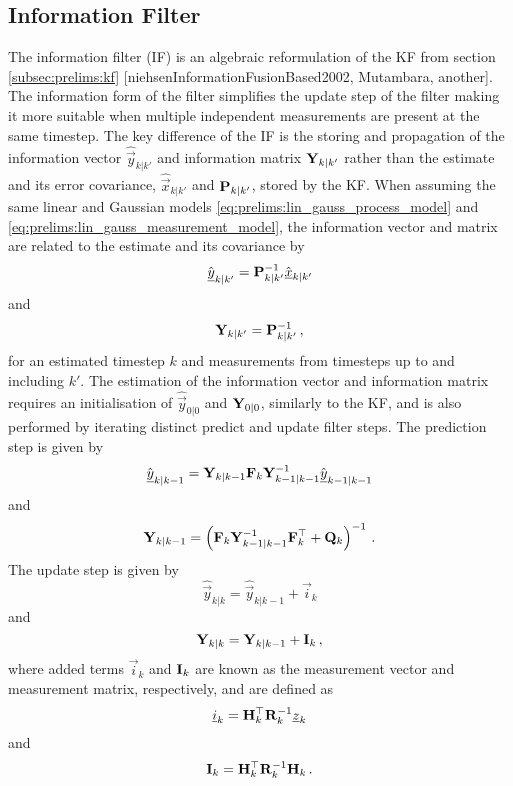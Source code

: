 \subsection{Information Filter}\label{subsec:prelims:if}
The information filter (IF) is an algebraic reformulation of the KF from section \ref{subsec:prelims:kf} [niehsenInformationFusionBased2002, Mutambara, another]. The information form of the filter simplifies the update step of the filter making it more suitable when multiple independent measurements are present at the same timestep. The key difference of the IF is the storing and propagation of the information vector $\hat{\vec{y}}_{k|k'}$ and information matrix ${{\mathbf{Y}}}_{k|k'}$ rather than the estimate and its error covariance, $\hat{\vec{x}}_{k|k'}$ and ${{\mathbf{P}}}_{k|k'}$, stored by the KF. When assuming the same linear and Gaussian models \eqref{eq:prelims:lin_gauss_process_model} and \eqref{eq:prelims:lin_gauss_measurement_model}, the information vector and matrix are related to the estimate and its covariance by
\begin{equation}\label{eq:prelims:info_vec_defn}
    \hat{{\underline{y}}}_{k|k'} = {{\mathbf{P}}}_{k|k'}^{-1}\hat{{\underline{x}}}_{k|k'}
\end{equation}
and
\begin{equation}\label{eq:prelims:info_mat_defn}
    {\ensuremath{{\mathbf{Y}}}}_{k|k'} = {{\mathbf{P}}}_{k|k'}^{-1}\,,
\end{equation}
for an estimated timestep $k$ and measurements from timesteps up to and including $k'$. The estimation of the information vector and information matrix requires an initialisation of $\hat{\vec{y}}_{0|0}$ and ${{\mathbf{Y}}}_{0|0}$, similarly to the KF, and is also performed by iterating distinct predict and update filter steps. The prediction step is given by
\begin{equation}\label{eq:prelims:if_info_vec_predict}
    \hat{{\underline{y}}}_{k|k-1} = {{\mathbf{Y}}}_{k|k-1}{{\mathbf{F}}}_k{{\mathbf{Y}}}_{k-1|k-1}^{-1}\hat{{\underline{y}}}_{k-1|k-1}
\end{equation}
and
\begin{equation}\label{eq:prelims:if_info_mat_predict}
    {\ensuremath{{\mathbf{Y}}}}_{k|k-1} = \left({{\mathbf{F}}}_k{{\mathbf{Y}}}_{k-1|k-1}^{-1}{{\mathbf{F}}}_k^\top + {{\mathbf{Q}}}_k\right)^{-1}\,.
\end{equation}
The update step is given by
\begin{equation}\label{eq:prelims:if_info_vec_update_single}
    \hat{\vec{y}}_{k|k} = \hat{\vec{y}}_{k|k-1} + \vec{i}_k
\end{equation}
and
\begin{equation}\label{eq:prelims:if_info_mat_update_single}
    {\ensuremath{{\mathbf{Y}}}}_{k|k} = {{\mathbf{Y}}}_{k|k-1} + {{\mathbf{I}}}_k\,,
\end{equation}
where added terms $\vec{i}_k$ and ${{\mathbf{I}}}_k$ are known as the measurement vector and measurement matrix, respectively, and are defined as
\begin{equation}
    {\underline{i}}_k = {{\mathbf{H}}}_k^\top{\ensuremath{{\mathbf{R}}}}_k^{-1}{\underline{z}}_k
\end{equation}
and
\begin{equation}
    {\ensuremath{{\mathbf{I}}}}_k = {{\mathbf{H}}}_k^\top{\ensuremath{{\mathbf{R}}}}_k^{-1}{{\mathbf{H}}}_k\,.
\end{equation}

